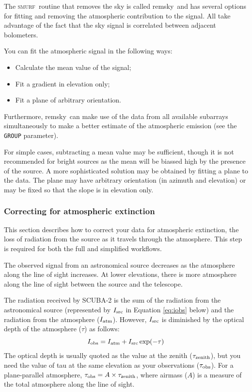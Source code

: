 \documentclass[twoside,11pt]{article}
\newcommand{\xref}[3]{#1}
\newcommand{\xlabel}[1]{}
\renewcommand{\_}{\texttt{\symbol{95}}}
\newcommand{\SMURF}{\textsc{smurf}}
\newcommand{\task}[1]{\textsf{#1}}
\newcommand{\remsky}{\xref{\task{remsky}}{sun258}{REMSKY}}
\begin{document}
The \SMURF\ routine that removes the sky is called \remsky\ and has
several options for fitting and removing the atmospheric contribution
to the signal. All take advantage of the fact that the sky signal is
correlated between adjacent bolometers.

You can fit the atmospheric signal in the following ways:
\begin{itemize}
\item Calculate the mean value of the signal;
\item Fit a gradient in elevation only;
\item Fit a plane of arbitrary orientation.
\end{itemize}
Furthermore, \remsky\ can make use of the data from all available
subarrays simultaneously to make a better estimate of the atmospheric
emission (see the \texttt{GROUP} parameter).

For simple cases, subtracting a mean value may be sufficient, though
it is not recommended for bright sources as the mean will be biassed
high by the presence of the source. A more sophisticated solution may
be obtained by fitting a plane to the data. The plane may have
arbitrary orientation (in azimuth and elevation) or may be fixed so
that the slope is in elevation only.

\subsubsection{\xlabel{extinction}Correcting for atmospheric extinction\label{se:extinction}}

This section describes how to correct your data for atmospheric
extinction, the loss of radiation from the source as it travels
through the atmosphere. This step is required for both the full and
simplified workflows.

The observed signal from an astronomical source decreases as the
atmosphere along the line of sight increases. At lower elevations,
there is more atmosphere along the line of sight between the source
and the telescope.

The radiation received by SCUBA-2 is the sum of the radiation from the
astronomical source (represented by $I_{\rm src}$ in Equation
\ref{eq:iobs} below) and the radiation from the atmosphere ($I_{\rm
  atm}$). However, $I_{\rm src}$ is diminished by the optical depth
of the atmosphere ($\tau$) as follows:
\begin{equation}
I_{\rm obs} = I_{\rm atm} + I_{\rm src} \exp(-\tau)
\label{eq:iobs}
\end{equation}
The optical depth is usually quoted as the value at the zenith
($\tau_{\rm zenith}$), but you need the value of tau at the same
elevation as your observations ($\tau_{\rm obs}$). For a
plane-parallel atmosphere, $\tau_{\rm obs} = A \times \tau_{\rm
  zenith}$, where airmass ($A$) is a measure of the total atmosphere
along the line of sight.
\end{document}
